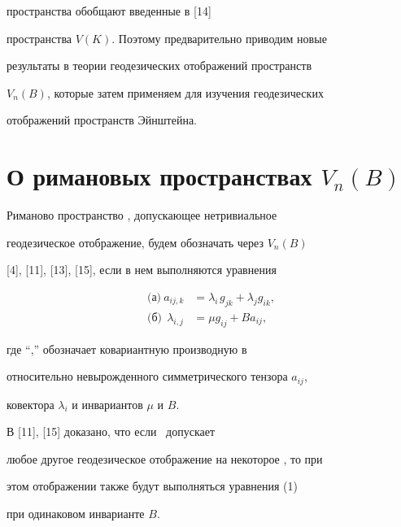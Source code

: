 пространства обобщают введенные в [14]


пространства $V(K)$. Поэтому предварительно приводим новые


результаты в теории геодезических отображений пространств


$V_n(B)$, которые затем применяем для изучения геодезических


отображений пространств Эйнштейна.








\section{О римановых пространствах $V_n(B)$}





Риманово пространство \vn, допускающее нетривиальное


геодезическое отображение, будем обозначать через $V_n(B)$


[4], [11], [13], [15], если в нем выполняются уравнения


\begin{equation}


\begin{split}


\text{(а)} \ a_{ij,k} &= \lambda_{i\,}g_{jk}+\lambda_{j}g_{ik},\\


\text{(б)} \ \ \lambda_{i,j} &= \mu g_{ij}+B a_{ij},


\end{split}


\end{equation}


где ``,'' обозначает ковариантную производную в \vn \ 


относительно невырожденного симметрического тензора $a_{ij}$,


ковектора $\lambda_{i}$ и инвариантов  $\mu$ и $B$.








В [11], [15] доказано, что если \vnb\ допускает


любое другое геодезическое отображение на некоторое \vnn, то при


этом отображении также будут выполняться уравнения (1)


при одинаковом инварианте $B$.


